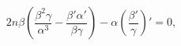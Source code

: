 \begin{equation}
2n \beta \left(\frac{\beta^{2}\gamma}{\alpha^{3}}-\frac{\beta'
\alpha'}{\beta \gamma}\right) - \alpha \left(
\frac{\beta'}{\gamma}\right)'=0,
\end{equation}

